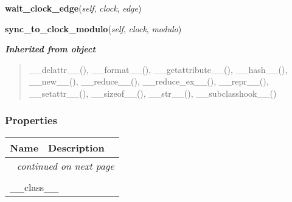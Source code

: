     \vspace{0.5ex}

\hspace{.8\funcindent}\begin{boxedminipage}{\funcwidth}

    \raggedright \textbf{wait\_clock\_edge}(\textit{self}, \textit{clock}, \textit{edge})

\setlength{\parskip}{2ex}
\setlength{\parskip}{1ex}
    \end{boxedminipage}

    \label{htd_player_ui:htd_player_ui:sync_to_clock_modulo}

    \vspace{0.5ex}

\hspace{.8\funcindent}\begin{boxedminipage}{\funcwidth}

    \raggedright \textbf{sync\_to\_clock\_modulo}(\textit{self}, \textit{clock}, \textit{modulo})

\setlength{\parskip}{2ex}
\setlength{\parskip}{1ex}
    \end{boxedminipage}


\large{\textbf{\textit{Inherited from object}}}

\begin{quote}
\_\_delattr\_\_(), \_\_format\_\_(), \_\_getattribute\_\_(), \_\_hash\_\_(), \_\_new\_\_(), \_\_reduce\_\_(), \_\_reduce\_ex\_\_(), \_\_repr\_\_(), \_\_setattr\_\_(), \_\_sizeof\_\_(), \_\_str\_\_(), \_\_subclasshook\_\_()
\end{quote}


  \subsubsection{Properties}

    \vspace{-1cm}
\hspace{\varindent}\begin{longtable}{|p{\varnamewidth}|p{\vardescrwidth}|l}
\cline{1-2}
\cline{1-2} \centering \textbf{Name} & \centering \textbf{Description}& \\
\cline{1-2}
\endhead\cline{1-2}\multicolumn{3}{r}{\small\textit{continued on next page}}\\\endfoot\cline{1-2}
\endlastfoot\multicolumn{2}{|l|}{\textit{Inherited from object}}\\
\multicolumn{2}{|p{\varwidth}|}{\raggedright \_\_class\_\_}\\
\cline{1-2}
\end{longtable}

